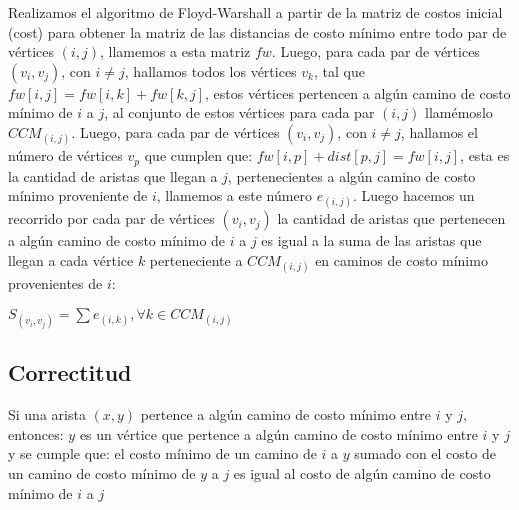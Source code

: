 \documentclass[article]{llncs}
\begin{document}
Realizamos el algoritmo de Floyd-Warshall a partir de la matriz de costos inicial (cost) para obtener la matriz de las distancias de costo mínimo entre todo par de vértices $(i,j)$, llamemos a esta matriz $fw$.
Luego, para cada par de vértices $(v_i,v_j)$, con $i \neq j$, hallamos todos los vértices $v_k$, tal que $fw[i,j] = fw[i,k] + fw[k,j]$, estos vértices pertencen a algún
camino de costo mínimo de $i$ a $j$, al conjunto de estos vértices para cada par $(i,j)$ llamémoslo $CCM_(i,j)$. Luego, para cada par de vértices $(v_i,v_j)$, con $i \neq j$, hallamos el número de vértices $v_p$ que cumplen que:
$fw[i,p] + dist[p,j] = fw[i,j]$, esta es la cantidad de aristas que llegan a $j$, pertenecientes a algún camino de costo mínimo proveniente de $i$, llamemos a este número $e_(i,j)$.
Luego hacemos un recorrido por cada par de vértices $(v_i,v_j)$ la cantidad de aristas que pertenecen a algún camino de costo mínimo de $i$ a $j$ es igual a la suma de las aristas que llegan a cada vértice $k$ perteneciente a $CCM_(i,j)$ en caminos de costo
mínimo provenientes de $i$:

$S_(v_i,v_j) = \sum e_(i,k), \forall k\in CCM_(i,j) $

\subsection{Correctitud}

Si una arista $(x,y)$ pertence a algún camino de costo mínimo entre $i$ y $j$, entonces: $y$ es un vértice que pertence a algún camino de costo mínimo entre $i$ y $j$ y se cumple que: 
el costo mínimo de un camino de $i$ a $y$ sumado con el costo de un camino de costo mínimo de $y$ a $j$ es igual al costo de algún camino de costo mínimo de $i$ a $j$
\end{document}
